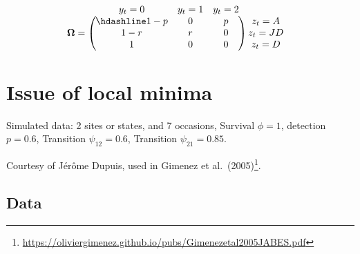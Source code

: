 \documentclass[
  12pt,
]{krantz}
\renewcommand{\href}[2]{#2\footnote{\url{#1}}}
\begin{document}
\[
\begin{matrix}
& \\
\mathbf{\Omega} =
    \left ( \vphantom{ \begin{matrix} 12 \\ 12 \\ 12\end{matrix} } \right .
\end{matrix}
\hspace{-1.2em}
\begin{matrix}
    y_t=0 & y_t=1 & y_t=2 \\ \hdashline
1 - p & 0 & p\\
1 - r & r & 0\\
1 & 0 & 0
\end{matrix}
\hspace{-0.2em}
\begin{matrix}
& \\
\left . \vphantom{ \begin{matrix} 12 \\ 12 \\ 12 \end{matrix} } \right )
    \begin{matrix}
    z_{t}=A \\ z_{t}=JD \\ z_{t}=D
    \end{matrix}
\end{matrix}
\]

\hypertarget{issue-of-local-minima}{%
\section{Issue of local minima}\label{issue-of-local-minima}}

Simulated data: 2 sites or states, and 7 occasions, Survival \(\phi = 1\), detection \(p = 0.6\), Transition \(\psi_{12} = 0.6\), Transition \(\psi_{21} = 0.85\).

Courtesy of Jérôme Dupuis, used in \href{https://oliviergimenez.github.io/pubs/Gimenezetal2005JABES.pdf}{Gimenez et al.~(2005)}.

\hypertarget{data}{%
\subsection{Data}\label{data}}
\end{document}
